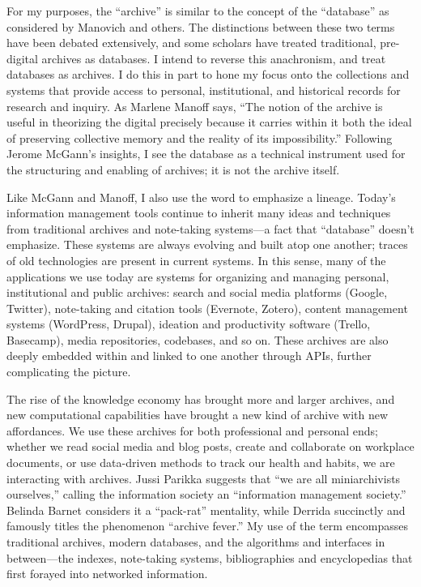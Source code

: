 For my purposes, the “archive” is similar to the concept of the “database” as considered by Manovich and others. The distinctions between these two terms have been debated extensively, and some scholars have treated traditional, pre-digital archives as databases.  I intend to reverse this anachronism, and treat databases as archives. I do this in part to hone my focus onto the collections and systems that provide access to personal, institutional, and historical records for research and inquiry. As Marlene Manoff says, “The notion of the archive is useful in theorizing the digital precisely because it carries within it both the ideal of preserving collective memory and the reality of its impossibility.”  Following Jerome McGann’s insights, I see the database as a technical instrument used for the structuring and enabling of archives; it is not the archive itself. 

Like McGann and Manoff, I also use the word to emphasize a lineage. Today’s information management tools continue to inherit many ideas and techniques from traditional archives and note-taking systems—a fact that “database” doesn’t emphasize. These systems are always evolving and built atop one another; traces of old technologies are present in current systems. In this sense, many of the applications we use today are systems for organizing and managing personal, institutional and public archives: search and social media platforms (Google, Twitter), note-taking and citation tools (Evernote, Zotero), content management systems (WordPress, Drupal), ideation and productivity software (Trello, Basecamp), media repositories, codebases, and so on. These archives are also deeply embedded within and linked to one another through APIs, further complicating the picture.

The rise of the knowledge economy has brought more and larger archives, and new computational capabilities have brought a new kind of archive with new affordances. We use these archives for both professional and personal ends; whether we read social media and blog posts, create and collaborate on workplace documents, or use data-driven methods to track our health and habits, we are interacting with archives. Jussi Parikka suggests that “we are all miniarchivists ourselves,” calling the information society an “information management society.”  Belinda Barnet considers it a “pack-rat” mentality, while Derrida succinctly and famously titles the phenomenon “archive fever.”  My use of the term encompasses traditional archives, modern databases, and the algorithms and interfaces in between—the indexes, note-taking systems, bibliographies and encyclopedias that first forayed into networked information.

